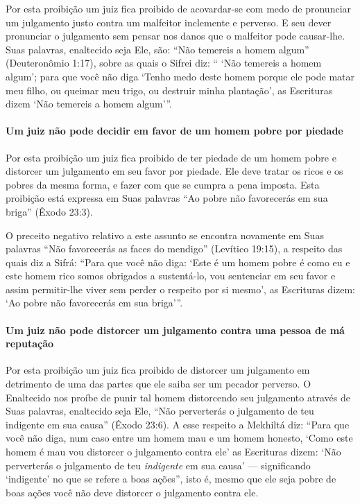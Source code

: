 Por esta proibição um juiz fica proibido de acovardar-se com medo de
pronunciar um julgamento justo contra um malfeitor inclemente e
perverso. E seu dever pronunciar o julgamento sem pensar nos danos que
o malfeitor pode causar-lhe. Suas palavras, enaltecido seja Ele, são:
``Não temereis a homem algum'' (Deuteronômio 1:17), sobre as quais o
Sifrei diz: `` `Não temereis a homem algum'; para que você não diga
`Tenho medo deste homem porque ele pode matar meu filho, ou queimar meu
trigo, ou destruir minha plantação', as Escrituras dizem `Não temereis a
homem algum'''.

\paragraph{Um juiz não pode decidir em favor de um homem pobre por piedade}

Por esta proibição um juiz fica proibido de ter piedade de um homem
pobre e distorcer um julgamento em seu favor por piedade. Ele deve
tratar os ricos e os pobres da mesma forma, e fazer com que se cumpra a
pena imposta. Esta proibição está expressa em Suas palavras ``Ao pobre
não favorecerás em sua briga'' (Êxodo 23:3).

O preceito negativo relativo a este assunto se encontra novamente em
Suas palavras ``Não favorecerás as faces do mendigo'' (Levítico 19:15),
a respeito das quais diz a Sifrá: ``Para que você não diga: `Este é um
homem pobre é como eu e este homem rico somos obrigados a sustentá-lo,
vou sentenciar em seu favor e assim permitir-lhe viver sem perder o
respeito por si mesmo', as Escrituras dizem: `Ao pobre não favorecerás
em sua briga'''.

\paragraph{Um juiz não pode distorcer um julgamento contra uma pessoa de má reputação}

Por esta proibição um juiz fica proibido de distorcer um julgamento em
detrimento de uma das partes que ele saiba ser um pecador perverso. O
Enaltecido nos proíbe de punir tal homem distorcendo seu julgamento
através de Suas palavras, enaltecido seja Ele, ``Não perverterás o
julgamento de teu indigente em sua causa'' (Êxodo 23:6). A esse
respeito a Mekhiltá diz: ``Para que você não diga, num caso entre um
homem mau e um homem honesto, `Como este homem é mau vou distorcer o
julgamento contra ele' as Escrituras dizem: `Não perverterás o
julgamento de teu \emph{indigente} em sua causa' --- significando
`indigente' no que se refere a boas ações'', isto é, mesmo que ele seja
pobre de boas ações você não deve distorcer o julgamento contra ele.

